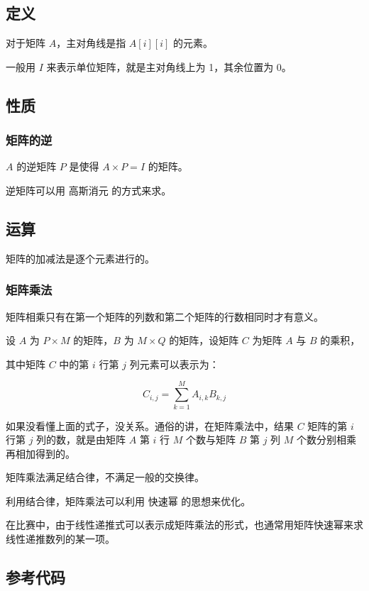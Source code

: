 
\subsection{定义}

对于矩阵 $A$，主对角线是指 $A[i][i]$ 的元素。

一般用 $I$ 来表示单位矩阵，就是主对角线上为 1，其余位置为 0。

\subsection{性质}

\subsubsection{矩阵的逆}

$A$ 的逆矩阵 $P$ 是使得 $A \times P = I$ 的矩阵。

逆矩阵可以用  高斯消元  的方式来求。

\subsection{运算}

矩阵的加减法是逐个元素进行的。

\subsubsection{矩阵乘法}

矩阵相乘只有在第一个矩阵的列数和第二个矩阵的行数相同时才有意义。

设 $A$ 为 $P \times M$ 的矩阵，$B$ 为 $M \times Q$ 的矩阵，设矩阵 $C$ 为矩阵 $A$ 与 $B$ 的乘积，

其中矩阵 $C$ 中的第 $i$ 行第 $j$ 列元素可以表示为：

$$
C_{i,j} = \sum_{k=1}^MA_{i,k}B_{k,j}
$$

如果没看懂上面的式子，没关系。通俗的讲，在矩阵乘法中，结果 $C$ 矩阵的第 $i$ 行第 $j$ 列的数，就是由矩阵 $A$ 第 $i$ 行 $M$ 个数与矩阵 $B$ 第 $j$ 列 $M$ 个数分别相乘再相加得到的。

矩阵乘法满足结合律，不满足一般的交换律。

利用结合律，矩阵乘法可以利用  快速幂  的思想来优化。

在比赛中，由于线性递推式可以表示成矩阵乘法的形式，也通常用矩阵快速幂来求线性递推数列的某一项。

\subsection{参考代码}

